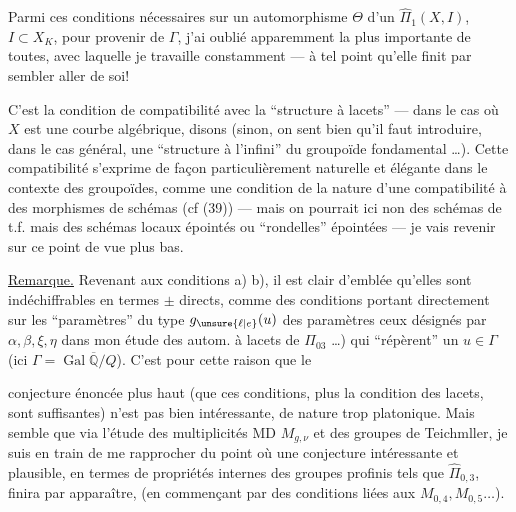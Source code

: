 Parmi ces conditions nécessaires  sur un automorphisme $\Theta$ d'un $\widehat{\Pi}_1(X,I)$, $I\subset X_K$, pour provenir de $\Gamma$, j'ai oublié apparemment la plus importante de toutes, avec laquelle je travaille  constamment --- à tel point qu'elle finit par sembler aller de soi!

C'est la condition de compatibilité avec la ``structure à lacets'' --- dans le cas où $X$ est une courbe algébrique, disons (sinon, on sent bien qu'il faut introduire, dans le cas général, une ``structure à l'infini'' du groupoïde fondamental \ldots). \margin{$\Vert$} Cette compatibilité  s'exprime de façon particulièrement naturelle et élégante dans le contexte des groupoïdes, \unsure{$\{$} comme une condition de la nature d'une compatibilité à des morphismes de schémas (cf (39)) --- mais on pourrait ici non des schémas de t.f. mais des schémas locaux épointés ou ``rondelles'' épointées --- je vais revenir sur ce point de vue plus bas.

\uline{Remarque.} Revenant aux conditions a) b), il est clair d'emblée qu'elles sont indéchiffrables  en termes $\pm$ directs, comme des conditions portant directement sur les ``paramètres'' du type $g_{\unsure{\ell|e}}(u)$ \unsure{$\{$|(}des paramètres   ceux désignés par $\alpha,\beta,\xi,\eta$ dans mon étude des autom. à lacets de $\Pi_{03}$ \ldots) qui ``répèrent'' un $u\in\Gamma$ (ici $\Gamma=\operatorname{Gal}\overline{\mathbb{Q}}/Q$).  C'est pour cette raison que le

conjecture énoncée plus haut (que ces conditions, plus la condition des lacets,  sont suffisantes) n'est pas bien intéressante, de nature trop platonique. Mais    semble que via l'étude des multiplicités MD $M_{g,\nu}$ et des groupes de Teichmller, je suis en train de me rapprocher du point où une conjecture intéressante et plausible, en termes de propriétés internes des groupes profinis tels que $\widehat{\Pi}_{0,3}$, finira par apparaître, (en commençant par des conditions liées aux $M_{0,4},M_{0,5}\ldots$).


